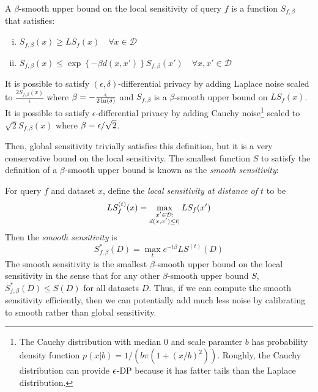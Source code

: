 \newpage
\begin{theorem}
\label{thm:smooth}
A $\beta$-smooth upper bound on the local sensitivity of query $f$ is a function $S_{f, \beta}$ that satisfies:
\vspace{-0.2in}
\begin{enumerate}[(i)]
	\item $S_{f, \beta}(x) \geq LS_f(x) \quad \forall x \in \mathcal{D}$
	\item $S_{f, \beta} (x) \leq \exp\left\{- \beta d(x, x') \right\} S_{f, \beta}(x') \quad \forall x, x' \in \mathcal{D}$
\end{enumerate}
\vspace{-0.2in}
It is possible to satisfy $(\epsilon, \delta)$-differential privacy by adding Laplace noise scaled to $\frac{2S_{f,\beta}(x)}{\epsilon}$ where $\beta = -\frac{\epsilon}{2 \ln(\delta)}$ and $S_{f, \beta}$ is a $\beta$-smooth upper bound on $LS_f(x)$. It is possible to satisfy $\epsilon$-differential privacy by adding Cauchy noise\footnote{The Cauchy distribution with median $0$ and scale paramter $b$ has probability density function $p(x|b) = 1/(b \pi(1+(x/b)^2 ) )$. Roughly, the Cauchy distribution can provide $\epsilon$-DP because it has fatter tails than the Laplace distribution.} scaled to $\sqrt{2}S_{f, \beta}(x)$ where $\beta = \epsilon/\sqrt{2}$.
\end{theorem}

 Then, global sensitivity trivially satisfies this definition, but it is a very conservative bound on the local sensitivity. The smallest function $S$ to satisfy the definition of a $\beta$-smooth upper bound is known as the \emph{smooth sensitivity}:
\begin{definition}
\label{def:smooth}
For query $f$ and dataset $x$, define the \emph{local sensitivity at distance of $t$} to be
$$LS_f^{(t)}(x) = \max_{\substack{x' \in \mathcal{D}:\\ d(x, x') \leq t|}} LS_f(x')$$
Then the \emph{smooth sensitivity} is
$$S^*_{f, \beta}(D) = \max_{t} e^{-t \beta}  LS^{(t)}(D)$$
The smooth sensitivity is the smallest $\beta$-smooth upper bound on the local sensitivity in the sense that for any other $\beta$-smooth upper bound $S$, $S^*_{f, \beta}(D) \leq S(D)$ for all datasets $D$. Thus, if we can compute the smooth sensitivity efficiently, then we can potentially add much less noise by calibrating to smooth rather than global sensitivity.
\end{definition}

